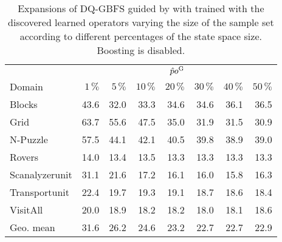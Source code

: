 \begin{table}[!h]
\centering
\caption[Expansions of \pog without boosting]{Expansions of DQ-GBFS guided by \hnn with \pog trained with the discovered learned operators varying the size of the sample set according to different percentages of the state space size. Boosting is disabled.}
\label{tab:learning_discovered_pos_boost0}
\vspace{\baselineskip}
\begin{tabular}{lrrrrrrr}
\toprule
& \multicolumn{7}{c}{$\hat po^{\text{G}}$} \\
\cmidrule(lr){2-8}
Domain     & $1\,\%$ & $5\,\%$   & $10\,\%$ & $20\,\%$ & $30\,\%$ & $40\,\%$ & $50\,\%$ \\ \midrule
Blocks         & 43.6 & 32.0 & 33.3  & 34.6  & 34.6  & 36.1  & 36.5  \\
Grid           & 63.7 & 55.6 & 47.5  & 35.0  & 31.9  & 31.5  & 30.9  \\
N-Puzzle       & 57.5 & 44.1 & 42.1  & 40.5  & 39.8  & 38.9  & 39.0  \\
Rovers         & 14.0 & 13.4 & 13.5  & 13.3  & 13.3  & 13.3  & 13.3  \\
Scanalyzerunit & 31.1 & 21.6 & 17.2  & 16.1  & 16.0  & 15.8  & 16.3  \\
Transportunit  & 22.4 & 19.7 & 19.3  & 19.1  & 18.7  & 18.6  & 18.4  \\
VisitAll       & 20.0 & 18.9 & 18.2  & 18.2  & 18.0  & 18.1  & 18.6  \\ \midrule
Geo. mean      & 31.6 & 26.2 & 24.6  & 23.2  & 22.7  & 22.7  & 22.9 \\ \bottomrule
\end{tabular}
\end{table}
